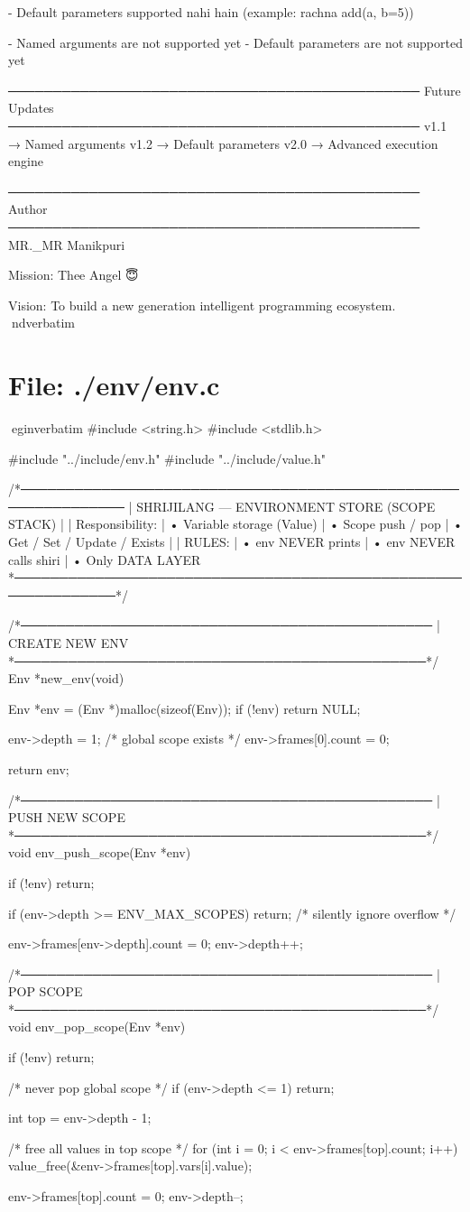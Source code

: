 \documentclass{article}
\begin{document}
- Default parameters supported nahi hain
  (example: rachna add(a, b=5))

- Named arguments are not supported yet
- Default parameters are not supported yet

──────────────────────────────────────────────
Future Updates
──────────────────────────────────────────────
v1.1 → Named arguments
v1.2 → Default parameters
v2.0 → Advanced execution engine

──────────────────────────────────────────────
Author
──────────────────────────────────────────────
MR._MR Manikpuri

Mission:
Thee Angel 😇

Vision:
To build a new generation intelligent programming ecosystem.
nd{verbatim}
\section*{File: ./env/env.c}
egin{verbatim}
#include <string.h>
#include <stdlib.h>

#include "../include/env.h"
#include "../include/value.h"

/*──────────────────────────────────────────────────────────────
 | SHRIJILANG — ENVIRONMENT STORE (SCOPE STACK)
 |
 | Responsibility:
 |   • Variable storage (Value)
 |   • Scope push / pop
 |   • Get / Set / Update / Exists
 |
 | RULES:
 |   • env NEVER prints
 |   • env NEVER calls shiri
 |   • Only DATA LAYER
 *──────────────────────────────────────────────────────────────*/

/*──────────────────────────────────────────────
 | CREATE NEW ENV
 *──────────────────────────────────────────────*/
Env *new_env(void)
{
    Env *env = (Env *)malloc(sizeof(Env));
    if (!env) return NULL;

    env->depth = 1; /* global scope exists */
    env->frames[0].count = 0;

    return env;
}

/*──────────────────────────────────────────────
 | PUSH NEW SCOPE
 *──────────────────────────────────────────────*/
void env_push_scope(Env *env)
{
    if (!env) return;

    if (env->depth >= ENV_MAX_SCOPES) {
        return; /* silently ignore overflow */
    }

    env->frames[env->depth].count = 0;
    env->depth++;
}

/*──────────────────────────────────────────────
 | POP SCOPE
 *──────────────────────────────────────────────*/
void env_pop_scope(Env *env)
{
    if (!env) return;

    /* never pop global scope */
    if (env->depth <= 1) return;

    int top = env->depth - 1;

    /* free all values in top scope */
    for (int i = 0; i < env->frames[top].count; i++) {
        value_free(&env->frames[top].vars[i].value);
    }

    env->frames[top].count = 0;
    env->depth--;
}
\end{document}
